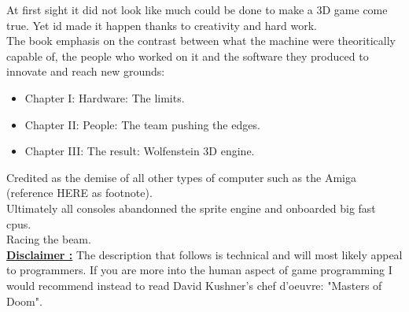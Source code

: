 At first sight it did not look like much could be done to make a 3D game come true. Yet id made it happen thanks to creativity and hard work.\\
The book emphasis on the contrast between what the machine were theoritically capable of, the people who worked on it and the software they produced to innovate and reach new grounds:
\begin{itemize}
\item Chapter I: Hardware: The limits.
\item Chapter II: People: The team pushing the edges.
\item Chapter III: The result: Wolfenstein 3D engine.
\end{itemize}
Credited as the demise of all other types of computer such as the Amiga (reference HERE as footnote).\\
Ultimately all consoles abandonned the sprite engine and onboarded big fast cpus.\\
Racing the beam.\\
 \textbf{\underline{Disclaimer :}} The description that follows is technical and will most likely appeal to programmers. If you are more into the human aspect of game programming I would recommend instead to read David Kushner's chef d'oeuvre: "Masters of Doom".